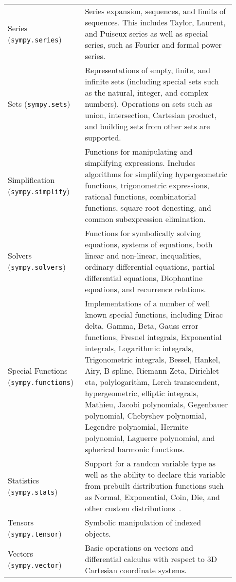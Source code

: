 \begin{longtable}[htbc]{>{\raggedright}p{0.30\linewidth}p{0.63\linewidth}}
Series (\texttt{sympy.series}) & Series expansion, sequences, and limits of sequences.
This includes Taylor, Laurent, and Puiseux series as well as special series, such
as Fourier and formal power series.\\

Sets (\texttt{sympy.sets}) & Representations of empty, finite, and infinite sets (including
special sets such as the natural, integer, and complex numbers). Operations
on sets such as union, intersection, Cartesian product, and building sets from
other sets are supported.\\

Simplification (\texttt{sympy.simplify}) & Functions for manipulating and simplifying expressions.
Includes algorithms for simplifying hypergeometric functions, trigonometric
expressions, rational functions, combinatorial functions, square root
denesting, and common subexpression elimination.\\

Solvers (\texttt{sympy.solvers}) & Functions for symbolically solving equations, systems
of equations, both linear and non-linear, inequalities, ordinary differential
equations, partial differential equations, Diophantine equations, and
recurrence relations.\\

Special Functions (\texttt{sympy.functions}) & Implementations of a number of well known special functions,
including Dirac delta, Gamma, Beta, Gauss error functions, Fresnel integrals,
Exponential integrals, Logarithmic integrals, Trigonometric integrals, Bessel,
Hankel, Airy, B-spline, Riemann Zeta, Dirichlet eta, polylogarithm, Lerch
transcendent, hypergeometric, elliptic integrals, Mathieu, Jacobi polynomials,
Gegenbauer polynomial, Chebyshev polynomial, Legendre polynomial, Hermite
polynomial, Laguerre polynomial, and
spherical harmonic functions.\\

Statistics (\texttt{sympy.stats}) & Support for a random variable type as well as the ability to
declare this variable from prebuilt distribution functions such as
Normal, Exponential, Coin, Die, and other custom distributions~\cite{StatsMRocklin}.\\

Tensors (\texttt{sympy.tensor}) & Symbolic manipulation of indexed objects.\\

Vectors (\texttt{sympy.vector}) & Basic operations on vectors and differential calculus with respect
to 3D Cartesian coordinate systems.\\
\bottomrule

\end{longtable}

